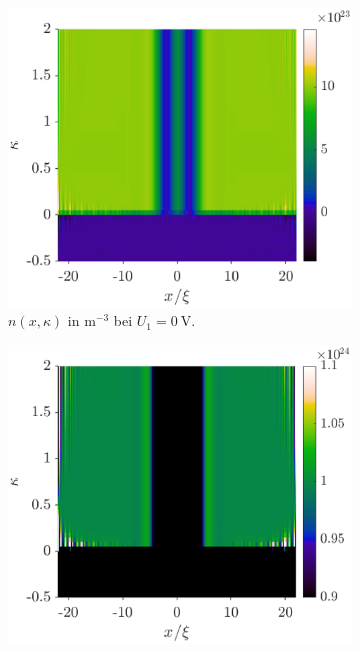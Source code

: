\begin{figure}
    \centering
    \begin{subfigure}[b]{0.48\textwidth}
        \centering
        \includegraphics[width=\textwidth]{plots/kappa/kappa_variation_0V_n.eps}
        \caption[]%
        {{\small $n(x,\kappa)$ in m$^{-3}$ bei $U_1=\SI{0}{\volt}$.}}
    \end{subfigure}
    \hfill
    \begin{subfigure}[b]{0.48\textwidth}
        \centering
        \includegraphics[width=\textwidth]{plots/kappa/kappa_variation_0V_n_zoomed.eps}

\end{subfigure}
\end{figure}
